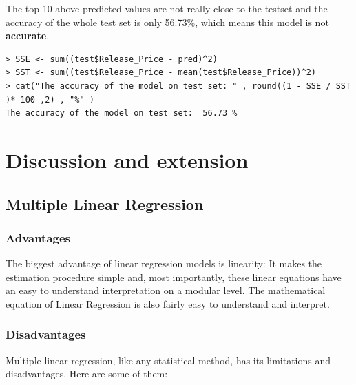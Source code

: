 \documentclass[a4paper]{article}
\theoremstyle{definition}
\begin{document}

The top 10 above predicted values are not really close to the test\textunderscore set and the accuracy of the whole test set is only 56.73\%, which means this model is not \textbf{accurate}. 
\begin{mdframed}[leftline=false,rightline=false,backgroundcolor=lightblue!10,nobreak=false,numbers=false]
    \begin{verbatim}
> SSE <- sum((test$Release_Price - pred)^2)
> SST <- sum((test$Release_Price - mean(test$Release_Price))^2)
> cat("The accuracy of the model on test set: " , round((1 - SSE / SST )* 100 ,2) , "%" )
The accuracy of the model on test set:  56.73 %
\end{verbatim}
\end{mdframed}
\pagebreak
\section{Discussion and extension}
\subsection{Multiple Linear Regression}
\subsubsection{Advantages}
The biggest advantage of linear regression models is linearity: It makes the estimation procedure simple and, most importantly, these linear equations have an easy to understand interpretation on a modular level. The mathematical equation of Linear Regression is also fairly easy to understand and interpret.
\subsubsection{Disadvantages}
Multiple linear regression, like any statistical method, has its limitations and disadvantages. Here are some of them:
\end{document}
